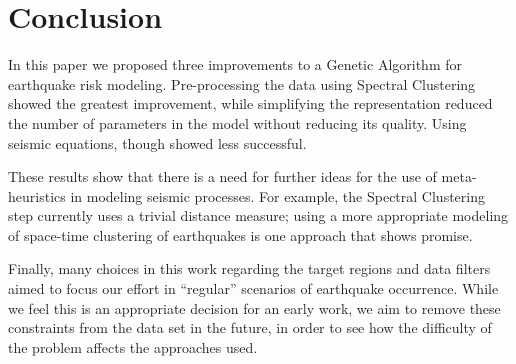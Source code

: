 \section{Conclusion}
\label{sec:conclusion}

In this paper we proposed three improvements to a Genetic Algorithm
for earthquake risk modeling. Pre-processing the data using Spectral
Clustering showed the greatest improvement, while simplifying the
representation reduced the number of parameters in the model without
reducing its quality. Using seismic equations, though showed less
successful.

These results show that there is a need for further ideas for the use
of meta-heuristics in modeling seismic processes. For example, the
Spectral Clustering step currently uses a trivial distance measure;
using a more appropriate modeling of space-time clustering of
earthquakes is one approach that shows promise.

Finally, many choices in this work regarding the target regions and
data filters aimed to focus our effort in ``regular'' scenarios of
earthquake occurrence. While we feel this is an appropriate decision
for an early work, we aim to remove these constraints from the data
set in the future, in order to see how the difficulty of the problem
affects the approaches used.
